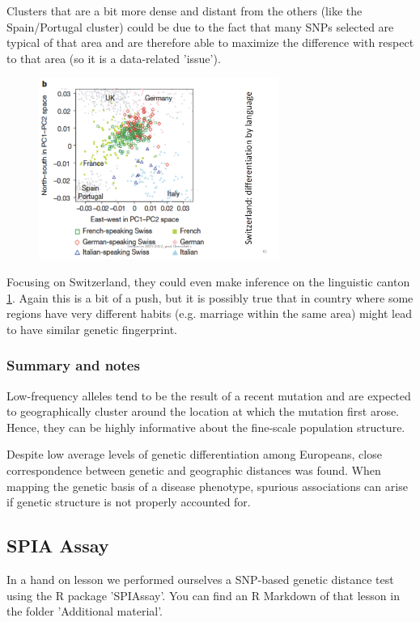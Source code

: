 Clusters that are a bit more dense and distant from the others (like the
Spain/Portugal cluster) could be due to the fact that many SNPs selected are
typical of that area and are therefore able to maximize the difference with
respect to that area (so it is a data-related 'issue').

\begin{figure}[h]
	\centering
	\includegraphics[width=0.7\textwidth]{PCA_swiss.PNG}
	\caption{\label{fig: PCA_swiss}}
\end{figure}

Focusing on Switzerland, they could even make inference on the linguistic canton
\ref{fig: PCA_swiss}. Again this is a bit of a push, but it is possibly true
that in country where some regions have very different habits (e.g. marriage
within the same area) might lead to have similar genetic fingerprint. 


\subsubsection{Summary and notes}
Low-frequency alleles tend to be the result of a recent mutation and are
expected to geographically cluster around the location at which the mutation
first arose. Hence, they can be highly informative about the fine-scale
population structure.

Despite low average levels of genetic differentiation among Europeans, close
correspondence between genetic and geographic distances was found. When mapping
the genetic basis of a disease phenotype, spurious associations can arise if
genetic structure is not properly accounted for.



\subsection{SPIA Assay}
In a hand on lesson we performed ourselves a SNP-based genetic distance test
using the R package 'SPIAssay'. You can find an R Markdown of that lesson in the
folder 'Additional material'. 
